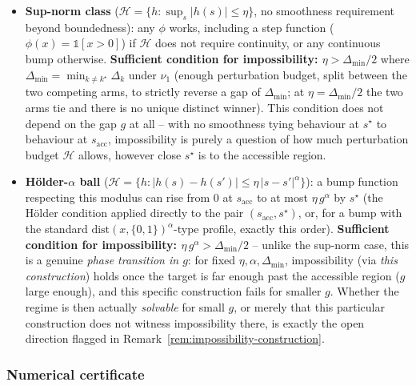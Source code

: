 \begin{itemize}
  \item \textbf{Sup-norm class} ($\mathcal{H} = \{h : \sup_s |h(s)| \le \eta\}$, no
    smoothness requirement beyond boundedness): any $\phi$ works, including a step
    function ($\phi(x) = \mathbb{1}[x > 0]$) if $\mathcal{H}$ does not require
    continuity, or any continuous bump otherwise. \textbf{Sufficient condition for
    impossibility: $\eta > \Delta_{\min} / 2$} where $\Delta_{\min} = \min_{k \ne
    k^\star} \Delta_k$ under $\nu_1$ (enough perturbation budget, split between the
    two competing arms, to strictly reverse a gap of $\Delta_{\min}$; at
    $\eta = \Delta_{\min}/2$ the two arms tie and there is no unique distinct winner).
    This condition does not depend on the gap $g$ at all -- with no smoothness tying
    behaviour at $s^\star$ to behaviour at $s_{\mathrm{acc}}$, impossibility is purely a
    question of how much perturbation budget $\mathcal{H}$ allows, however close
    $s^\star$ is to the accessible region.
  \item \textbf{H\"older-$\alpha$ ball} ($\mathcal{H} = \{h : |h(s) - h(s')| \le
    \eta\, |s-s'|^\alpha\}$): a bump function respecting this modulus can rise from $0$
    at $s_{\mathrm{acc}}$ to at most $\eta \, g^\alpha$ by $s^\star$ (the H\"older
    condition applied directly to the pair $(s_{\mathrm{acc}}, s^\star)$, or, for a bump
    with the standard $\mathrm{dist}(x, \{0,1\})^\alpha$-type profile, exactly this
    order). \textbf{Sufficient condition for impossibility: $\eta \, g^\alpha >
    \Delta_{\min}/2$} -- unlike the sup-norm case, this is a genuine \emph{phase
    transition in $g$}: for fixed $\eta, \alpha, \Delta_{\min}$, impossibility
    (via \emph{this construction}) holds once the target is far enough past the
    accessible region ($g$ large enough), and this specific construction fails for smaller
    $g$. Whether the regime is then actually \emph{solvable} for small $g$, or merely
    that this particular construction does not witness impossibility there, is exactly
    the open direction flagged in Remark~\ref{rem:impossibility-construction}.
\end{itemize}

\subsubsection{Numerical certificate}
\label{sec:theorem2-certificate}

